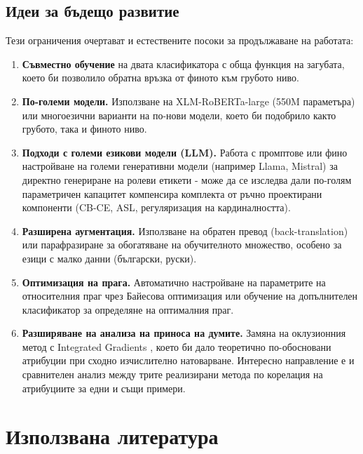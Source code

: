 \documentclass[12pt,a4paper]{report}
\begin{document}
\section{Идеи за бъдещо развитие}

Тези ограничения очертават и естествените посоки за продължаване на работата:

\begin{enumerate}
  \item \textbf{Съвместно обучение} на двата класификатора с обща функция на загубата, което би позволило обратна връзка от финото към грубото ниво.
  \item \textbf{По-големи модели.} Използване на XLM-RoBERTa-large (550M параметъра) или многоезични варианти на по-нови модели, което би подобрило както грубото, така и финото ниво.
  \item \textbf{Подходи с големи езикови модели (LLM).} Работа с промптове или фино настройване на големи генеративни модели (например Llama, Mistral) за директно генериране на ролеви етикети - може да се изследва дали по-голям параметричен капацитет компенсира комплекта от ръчно проектирани компоненти (CB-CE, ASL, регуляризация на кардиналността).
  \item \textbf{Разширена аугментация.} Използване на обратен превод (back-translation) или парафразиране за обогатяване на обучителното множество, особено за езици с малко данни (български, руски).
  \item \textbf{Оптимизация на прага.} Автоматично настройване на параметрите на относителния праг чрез Байесова оптимизация или обучение на допълнителен класификатор за определяне на оптималния праг.
  \item \textbf{Разширяване на анализа на приноса на думите.} Замяна на оклузионния метод с Integrated Gradients \cite{sundararajan2017ig}, което би дало теоретично по-обосновани атрибуции при сходно изчислително натоварване. Интересно направление е и сравнителен анализ между трите реализирани метода по корелация на атрибуциите за едни и същи примери.
\end{enumerate}


\chapter*{Използвана литература}
\printbibliography[heading=none]
\end{document}
